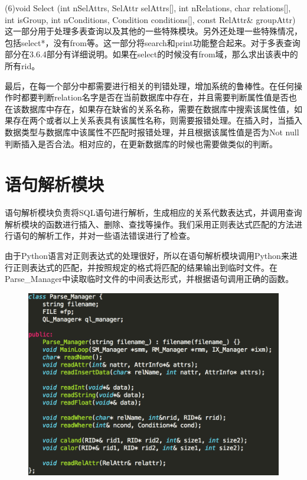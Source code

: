 (6)void Select (int nSelAttrs, SelAttr selAttrs[], int nRelations, char relations[], int isGroup, int nConditions, Condition conditions[], const RelAttr\& groupAttr) 
这一部分用于处理多表查询以及其他的一些特殊模块。另外还处理一些特殊情况，包括select*，没有from等。这一部分将search和print功能整合起来。对于多表查询部分在3.6.4部分有详细说明。如果在select的时候没有from域，那么求出该表中的所有rid。

最后，在每一个部分中都需要进行相关的判错处理，增加系统的鲁棒性。在任何操作时都要判断relation名字是否在当前数据库中存在，并且需要判断属性值是否也在该数据库中存在，如果存在缺省的关系名称，需要在数据库中搜索该属性值，如果存在两个或者以上关系表具有该属性名称，则需要报错处理。在插入时，当插入数据类型与数据库中该属性不匹配时报错处理，并且根据该属性值是否为Not null判断插入是否合法。相对应的，在更新数据库的时候也需要做类似的判断。

\section{语句解析模块}

语句解析模块负责将SQL语句进行解析，生成相应的关系代数表达式，并调用查询解析模块的函数进行插入、删除、查找等操作。我们采用正则表达式匹配的方法进行语句的解析工作，并对一些语法错误进行了检查。

由于Python语言对正则表达式的处理很好，所以在语句解析模块调用Python来进行正则表达式的匹配，并按照规定的格式将匹配的结果输出到临时文件。在Parse\_Manager中读取临时文件的中间表达形式，并根据语句调用正确的函数。

\begin{figure}[H]
\centering
\includegraphics[width=5in]{Figures/Parse_manager.png}
\end{figure}


